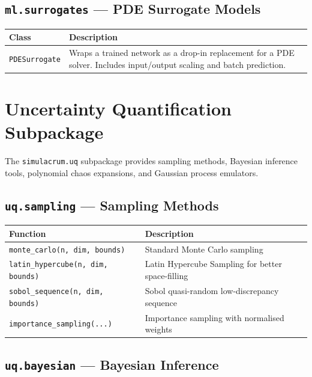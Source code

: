 \documentclass[11pt,a4paper]{report}
\begin{document}
\section{\texttt{ml.surrogates} --- PDE Surrogate Models}

\begin{longtable}{lp{8cm}}
\toprule
\textbf{Class} & \textbf{Description} \\
\midrule
\texttt{PDESurrogate} & Wraps a trained network as a drop-in replacement for a PDE solver. Includes input/output scaling and batch prediction. \\
\bottomrule
\end{longtable}

\chapter{Uncertainty Quantification Subpackage}

The \texttt{simulacrum.uq} subpackage provides sampling methods, Bayesian inference tools, polynomial chaos expansions, and Gaussian process emulators.

\section{\texttt{uq.sampling} --- Sampling Methods}

\begin{longtable}{lp{8cm}}
\toprule
\textbf{Function} & \textbf{Description} \\
\midrule
\texttt{monte\_carlo(n, dim, bounds)} & Standard Monte Carlo sampling \\
\texttt{latin\_hypercube(n, dim, bounds)} & Latin Hypercube Sampling for better space-filling \\
\texttt{sobol\_sequence(n, dim, bounds)} & Sobol quasi-random low-discrepancy sequence \\
\texttt{importance\_sampling(...)} & Importance sampling with normalised weights \\
\bottomrule
\end{longtable}

\section{\texttt{uq.bayesian} --- Bayesian Inference}
\end{document}
